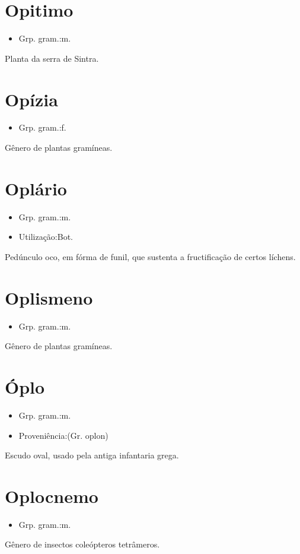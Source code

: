 \section{Opitimo}
\begin{itemize}
\item {Grp. gram.:m.}
\end{itemize}
Planta da serra de Sintra.
\section{Opízia}
\begin{itemize}
\item {Grp. gram.:f.}
\end{itemize}
Gênero de plantas gramíneas.
\section{Oplário}
\begin{itemize}
\item {Grp. gram.:m.}
\end{itemize}
\begin{itemize}
\item {Utilização:Bot.}
\end{itemize}
Pedúnculo oco, em fórma de funil, que sustenta a fructificação de certos líchens.
\section{Oplismeno}
\begin{itemize}
\item {Grp. gram.:m.}
\end{itemize}
Gênero de plantas gramíneas.
\section{Óplo}
\begin{itemize}
\item {Grp. gram.:m.}
\end{itemize}
\begin{itemize}
\item {Proveniência:(Gr. \textunderscore oplon\textunderscore )}
\end{itemize}
Escudo oval, usado pela antiga infantaria grega.
\section{Oplocnemo}
\begin{itemize}
\item {Grp. gram.:m.}
\end{itemize}
Gênero de insectos coleópteros tetrâmeros.
